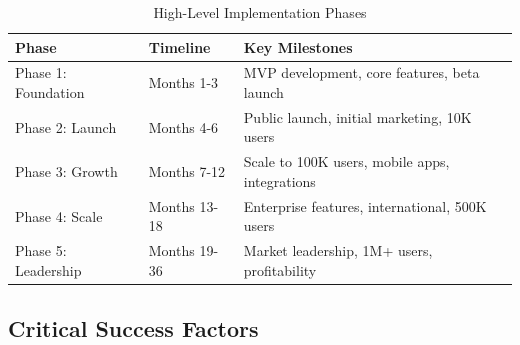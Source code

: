 \begin{table}[H]
\centering
\caption{High-Level Implementation Phases}
\begin{tabular}{|l|p{3cm}|p{7cm}|}
\hline
\rowcolor{lightgray}
\textbf{Phase} & \textbf{Timeline} & \textbf{Key Milestones} \\
\hline
Phase 1: Foundation & Months 1-3 & MVP development, core features, beta launch \\
\hline
Phase 2: Launch & Months 4-6 & Public launch, initial marketing, 10K users \\
\hline
Phase 3: Growth & Months 7-12 & Scale to 100K users, mobile apps, integrations \\
\hline
Phase 4: Scale & Months 13-18 & Enterprise features, international, 500K users \\
\hline
Phase 5: Leadership & Months 19-36 & Market leadership, 1M+ users, profitability \\
\hline
\end{tabular}
\end{table}

\subsection{Critical Success Factors}

